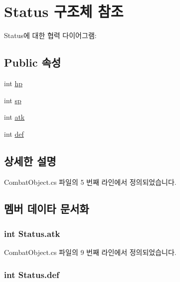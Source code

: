 \hypertarget{struct_status}{}\section{Status 구조체 참조}
\label{struct_status}


Status에 대한 협력 다이어그램\+:
\subsection*{Public 속성}
\begin{DoxyCompactItemize}
\item 
int \hyperlink{struct_status_a6912591952ae3178114200d6383919df}{hp}
\item 
int \hyperlink{struct_status_a685aa4b12faa74a48a3b57f69e94084c}{sp}
\item 
int \hyperlink{struct_status_aeaf2f82dd6fbce2adf2219b7a6b8227f}{atk}
\item 
int \hyperlink{struct_status_a95a2f2a23ef79f2e0ced04621c4593c9}{def}
\end{DoxyCompactItemize}


\subsection{상세한 설명}


Combat\+Object.\+cs 파일의 5 번째 라인에서 정의되었습니다.



\subsection{멤버 데이타 문서화}
\subsubsection[{\texorpdfstring{atk}{atk}}]{\setlength{\rightskip}{0pt plus 5cm}int Status.\+atk}\hypertarget{struct_status_aeaf2f82dd6fbce2adf2219b7a6b8227f}{}\label{struct_status_aeaf2f82dd6fbce2adf2219b7a6b8227f}


Combat\+Object.\+cs 파일의 9 번째 라인에서 정의되었습니다.

\subsubsection[{\texorpdfstring{def}{def}}]{\setlength{\rightskip}{0pt plus 5cm}int Status.\+def}\hypertarget{struct_status_a95a2f2a23ef79f2e0ced04621c4593c9}{}\label{struct_status_a95a2f2a23ef79f2e0ced04621c4593c9}


